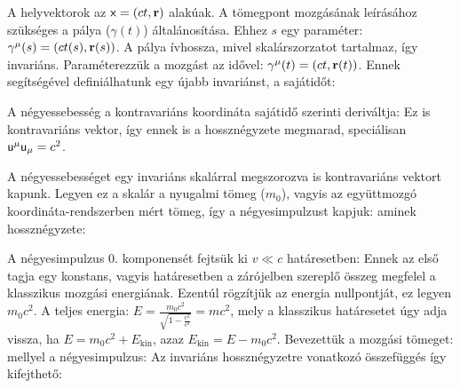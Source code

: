    A helyvektorok az $\mathsf{x}=(ct,\mathbf{r})$ alakúak. A tömegpont mozgásának leírásához szükséges a pálya ($\gamma(t)$) általánosítása. Ehhez $s$ egy paraméter: $\gamma^\mu(s)=(ct(s),\mathbf{r}(s))$. A pálya ívhossza, mivel skalárszorzatot tartalmaz, így invariáns. Paraméterezzük a mozgást az idővel: $\mathsf{\gamma}^\mu(t)=(ct,\mathbf{r}(t))$. Ennek segítségével definiálhatunk egy újabb invariánst, a sajátidőt:
   
   A négyessebesség a kontravariáns koordináta sajátidő szerinti deriváltja:
   Ez is kontravariáns vektor, így ennek is a hossznégyzete megmarad, speciálisan $\mathsf{u}^\mu\mathsf{u}_\mu=c^2$. 
   
   A négyessebességet egy invariáns skalárral megszorozva is kontravariáns vektort kapunk. Legyen ez a skalár a nyugalmi tömeg ($m_0$), vagyis az együttmozgó koordináta-rendszerben mért tömeg, így a négyesimpulzust kapjuk:
   aminek hossznégyzete: 
   
   A négyesimpulzus 0. komponensét fejtsük ki $v\ll c$ határesetben:
   Ennek az első tagja egy konstans, vagyis határesetben a zárójelben szereplő összeg megfelel a klasszikus mozgási energiának. Ezentúl rögzítjük az energia nullpontját, ez legyen $m_0c^2$. A teljes energia: $E=\frac{m_0c^2}{\sqrt{1-\frac{v^2}{c^2}}}=mc^2$, mely a klasszikus határesetet úgy adja vissza, ha $E=m_0c^2+E_\text{kin}$, azaz $E_\text{kin}=E-m_0c^2$. Bevezettük a mozgási tömeget:
   mellyel a négyesimpulzus:
   Az invariáns hossznégyzetre vonatkozó összefüggés így kifejthető:
   
